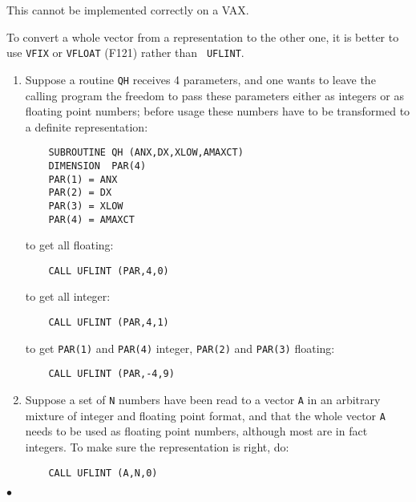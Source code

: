 \Notes
This cannot be implemented correctly on a VAX.
\par
To convert a whole vector from a representation to the other one,
it is better to use {\tt VFIX} or {\tt VFLOAT} (F121) rather than {\tt
UFLINT}.
\newpage
\Examples
\begin{enumerate}
\item  Suppose a routine {\tt QH} receives 4 parameters, and one wants to
leave the calling program the freedom to pass these parameters either as
integers or as floating point numbers; before usage these numbers have
to be transformed to a definite representation:
\begin{verbatim}
    SUBROUTINE QH (ANX,DX,XLOW,AMAXCT)
    DIMENSION  PAR(4)
    PAR(1) = ANX
    PAR(2) = DX
    PAR(3) = XLOW
    PAR(4) = AMAXCT
\end{verbatim}
to get all floating:
\begin{verbatim}
    CALL UFLINT (PAR,4,0)
\end{verbatim}
to get all integer:
\begin{verbatim}
    CALL UFLINT (PAR,4,1)
\end{verbatim}
to get {\tt PAR(1)} and  {\tt PAR(4)} integer,
{\tt PAR(2)} and  {\tt PAR(3)} floating:
\begin{verbatim}
    CALL UFLINT (PAR,-4,9)
\end{verbatim}
\item  Suppose a set of {\tt N} numbers have been read to a vector
{\tt A} in an arbitrary mixture of integer and floating point format, and
that the whole vector {\tt A} needs to be used as floating point
numbers, although most are in fact integers. To make sure the
representation is right, do:
\begin{verbatim}
    CALL UFLINT (A,N,0)
\end{verbatim}
\end{enumerate}
$\bullet$
